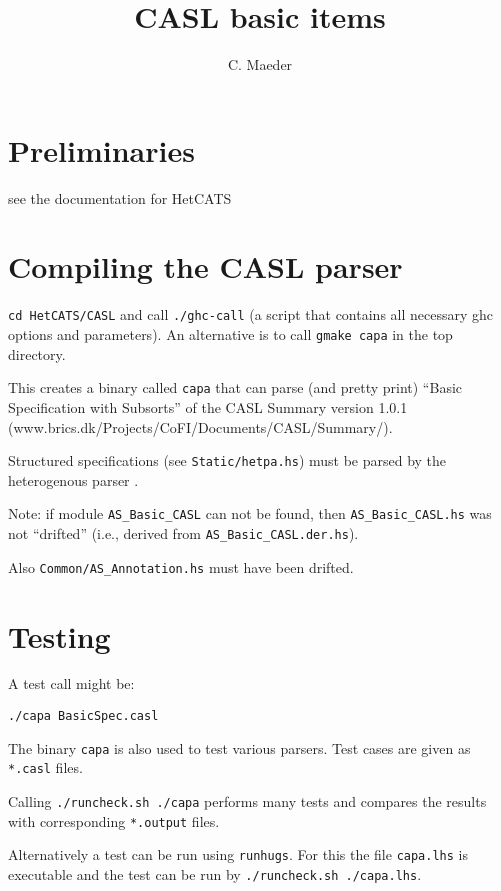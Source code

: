 \documentclass{article}
\begin{document}
\title{CASL basic items}

\author{C. Maeder}

\maketitle

\section{Preliminaries}

see the documentation for HetCATS


\section{Compiling the CASL parser}

\texttt{cd HetCATS/CASL} and call \texttt{./ghc-call} (a script that contains
all necessary ghc options and parameters). An alternative is to call
\texttt{gmake capa} in the top directory.

This creates a binary called \texttt{capa} that can parse (and pretty
print) ``Basic Specification with Subsorts'' of the CASL Summary
version 1.0.1 \\ (www.brics.dk/Projects/CoFI/Documents/CASL/Summary/).

Structured specifications (see \texttt{Static/hetpa.hs}) must be parsed by the heterogenous parser
.

Note: if module \texttt{AS\_Basic\_CASL} can not be found, then
\texttt{AS\_Basic\_CASL.hs} was not ``drifted'' (i.e., derived from
\texttt{AS\_Basic\_CASL.der.hs}). 

Also \texttt{Common/AS\_Annotation.hs} must have been drifted.

\section{Testing}

A test call might be: 

\texttt{./capa BasicSpec.casl}

The binary \texttt{capa} is also used to test various parsers. Test cases are
given as \texttt{*.casl} files.

Calling \texttt{./runcheck.sh ./capa} performs many tests and compares the
results with corresponding \texttt{*.output} files.

Alternatively a test can be run using \texttt{runhugs}. For this the
file \texttt{capa.lhs} is executable and the test can be run
by \texttt{./runcheck.sh ./capa.lhs}.
\end{document}
